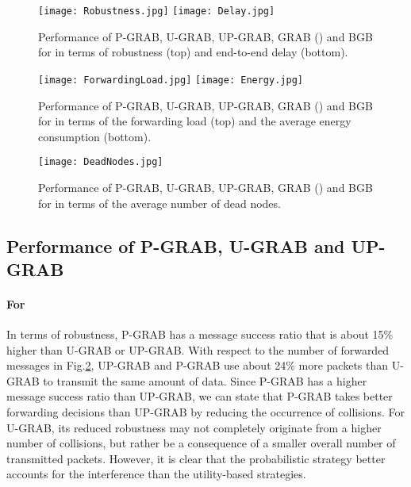 \documentclass[journal, peerreview, onecolumn, draftcls]{IEEEtran}
\begin{document}
\begin{figure}
  \texttt{[image: Robustness.jpg]}
  \vspace{0.1in}
  \texttt{[image: Delay.jpg]}
    \caption{Performance of P-GRAB, U-GRAB, UP-GRAB, GRAB () and BGB for  in terms of robustness (top) and end-to-end delay (bottom).}
    \label{fig:resGGRAB-RobDel}
\end{figure}


\begin{figure}
  \texttt{[image: ForwardingLoad.jpg]}
  \vspace{0.1in}
  \texttt{[image: Energy.jpg]}
    \caption{Performance of P-GRAB, U-GRAB, UP-GRAB, GRAB () and BGB for  in terms of the forwarding load (top) and the average energy consumption (bottom).}
    \label{fig:resGGRAB-ForEn}
\end{figure}


\begin{figure}
  \texttt{[image: DeadNodes.jpg]}
        \caption{Performance of P-GRAB, U-GRAB, UP-GRAB, GRAB () and BGB for  in terms of the average number of dead nodes.}
    \label{fig:resGGRAB-Dead}
\end{figure}


\subsection{Performance of P-GRAB, U-GRAB and UP-GRAB}

\paragraph{\rm For }
In terms of robustness, P-GRAB has a message success ratio that is about 15\% higher than U-GRAB or UP-GRAB.
With respect to the number of forwarded messages in Fig.\ref{fig:resGGRAB-ForEn}, UP-GRAB and P-GRAB use about 24\% more packets than U-GRAB to transmit the same amount of data. Since P-GRAB has a higher message success ratio than UP-GRAB, we can state that P-GRAB takes better forwarding decisions than UP-GRAB by reducing the occurrence of collisions. For U-GRAB, its reduced robustness may not completely originate from a higher number of collisions, but rather be a consequence of a smaller overall number of transmitted packets. However, it is clear that the probabilistic strategy better accounts for the interference than the utility-based strategies.
\end{document}
